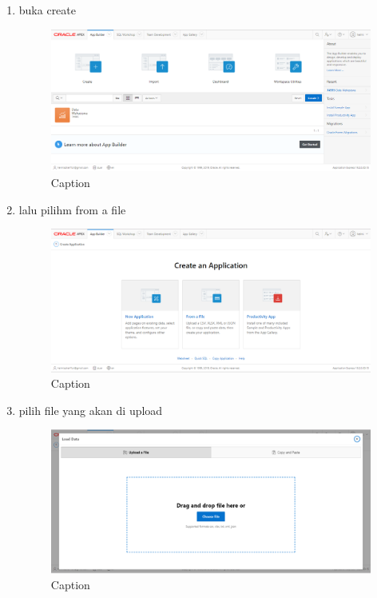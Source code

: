 ﻿\documentclass{article}
\begin{document}
\begin{enumerate}
    \item buka create
    \begin{figure}
        \centering
        \includegraphics[scale=0.35]{gambar/3.PNG}
        \caption{Caption}
        \label{fig:my_label}
    \end{figure}

    \item lalu pilihm from a file
    \begin{figure}
        \centering
        \includegraphics[scale=0.35]{gambar/4.PNG}
        \caption{Caption}
        \label{fig:my_label}
    \end{figure}

    \item pilih file yang akan di upload
    \begin{figure}
        \centering
        \includegraphics[scale=0.35]{gambar/5.PNG}
        \caption{Caption}
        \label{fig:my_label}
    \end{figure}


\end{enumerate}
\end{document}
